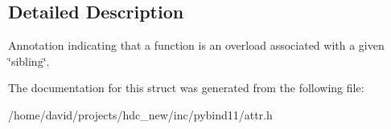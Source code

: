 \subsection{Detailed Description}
Annotation indicating that a function is an overload associated with a given \char`\"{}sibling\char`\"{}. 

The documentation for this struct was generated from the following file\+:\begin{DoxyCompactItemize}
\item 
/home/david/projects/hdc\+\_\+new/inc/pybind11/attr.\+h\end{DoxyCompactItemize}
